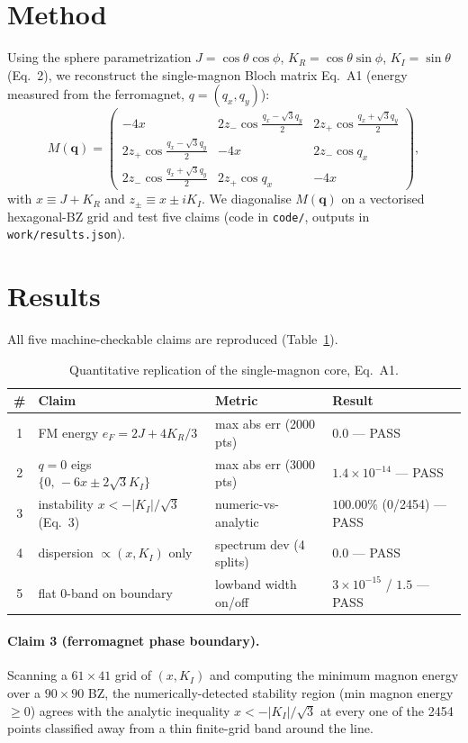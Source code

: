\documentclass[11pt]{article}
\begin{document}
\section{Method}
Using the sphere parametrization $J=\cos\theta\cos\phi$, $K_R=\cos\theta\sin\phi$,
$K_I=\sin\theta$ (Eq.~2), we reconstruct the single-magnon Bloch matrix Eq.~A1
(energy measured from the ferromagnet, $q=(q_x,q_y)$):
\begin{equation}
M(\mathbf q)=\!\begin{pmatrix}
-4x & 2z_-\cos\frac{q_x-\sqrt3 q_y}{2} & 2z_+\cos\frac{q_x+\sqrt3 q_y}{2}\\[2pt]
2z_+\cos\frac{q_x-\sqrt3 q_y}{2} & -4x & 2z_-\cos q_x\\[2pt]
2z_-\cos\frac{q_x+\sqrt3 q_y}{2} & 2z_+\cos q_x & -4x
\end{pmatrix},
\end{equation}
with $x\equiv J+K_R$ and $z_\pm\equiv x\pm iK_I$. We diagonalise $M(\mathbf q)$ on a
vectorised hexagonal-BZ grid and test five claims (code in
\texttt{code/}, outputs in \texttt{work/results.json}).

\section{Results}
All five machine-checkable claims are reproduced (Table~\ref{tab:res}).

\begin{table}[h]\centering
\begin{tabular}{clll}
\toprule
\# & Claim & Metric & Result\\
\midrule
1 & FM energy $e_F=2J+4K_R/3$ & max abs err (2000 pts) & $0.0$ --- PASS\\
2 & $q{=}0$ eigs $\{0,\,-6x\pm2\sqrt3 K_I\}$ & max abs err (3000 pts) & $1.4\times10^{-14}$ --- PASS\\
3 & instability $x<-|K_I|/\sqrt3$ (Eq.~3) & numeric-vs-analytic & $100.00\%$ (0/2454) --- PASS\\
4 & dispersion $\propto (x,K_I)$ only & spectrum dev (4 splits) & $0.0$ --- PASS\\
5 & flat $0$-band on boundary & lowband width on/off & $3\times10^{-15}$ / $1.5$ --- PASS\\
\bottomrule
\end{tabular}
\caption{Quantitative replication of the single-magnon core, Eq.~A1.}
\label{tab:res}
\end{table}

\paragraph{Claim 3 (ferromagnet phase boundary).} Scanning a $61\times41$ grid of
$(x,K_I)$ and computing the minimum magnon energy over a $90\times90$ BZ, the
numerically-detected stability region (min magnon energy $\ge0$) agrees with the
analytic inequality $x<-|K_I|/\sqrt3$ at every one of the 2454 points classified
away from a thin finite-grid band around the line.
\end{document}
